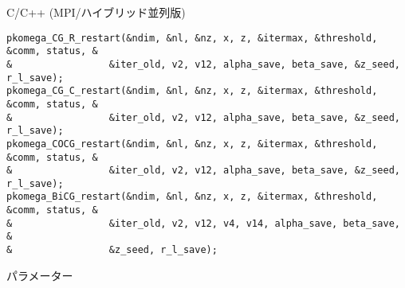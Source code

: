\documentclass[12pt,titlepage]{jarticle}
\begin{document}
  \noindent C/C++ (MPI/ハイブリッド並列版)
  
\begin{verbatim}
pkomega_CG_R_restart(&ndim, &nl, &nz, x, z, &itermax, &threshold, &comm, status, &
&                 &iter_old, v2, v12, alpha_save, beta_save, &z_seed, r_l_save);
pkomega_CG_C_restart(&ndim, &nl, &nz, x, z, &itermax, &threshold, &comm, status, &
&                 &iter_old, v2, v12, alpha_save, beta_save, &z_seed, r_l_save);
pkomega_COCG_restart(&ndim, &nl, &nz, x, z, &itermax, &threshold, &comm, status, &
&                 &iter_old, v2, v12, alpha_save, beta_save, &z_seed, r_l_save);
pkomega_BiCG_restart(&ndim, &nl, &nz, x, z, &itermax, &threshold, &comm, status, &
&                 &iter_old, v2, v12, v4, v14, alpha_save, beta_save, &
&                 &z_seed, r_l_save);
\end{verbatim}

\noindent パラメーター
\end{document}
